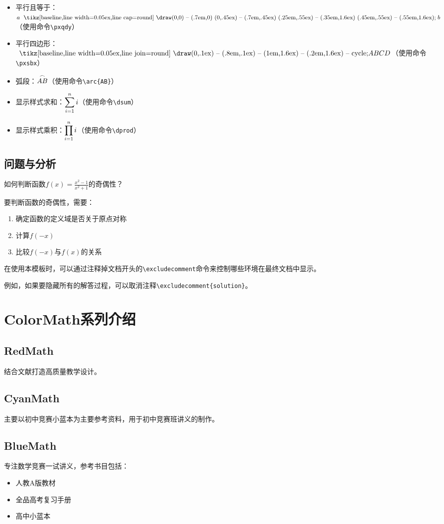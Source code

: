 \documentclass[fancy]{ColorMath} %
\begin{document}
\begin{itemize}
    \item 平行且等于：$a \pxqdy b$（使用命令\verb|\pxqdy|）
    \item 平行四边形：$\pxsbx ABCD$（使用命令\verb|\pxsbx|）
    \item 弧段：$\overset{\frown}{AB}$（使用命令\verb|\arc{AB}|）
    \item 显示样式求和：$\displaystyle\sum_{i=1}^n i$（使用命令\verb|\dsum|）
    \item 显示样式乘积：$\displaystyle\prod_{i=1}^n i$（使用命令\verb|\dprod|）
\end{itemize}


\subsection{问题与分析}

\begin{example}
    如何判断函数$f(x) = \frac{x^2 - 1}{x^2 + 1}$的奇偶性？
\end{example}

\begin{analysis}
    要判断函数的奇偶性，需要：
    \begin{enumerate}
        \item 确定函数的定义域是否关于原点对称
        \item 计算$f(-x)$
        \item 比较$f(-x)$与$f(x)$的关系
    \end{enumerate}
\end{analysis}

\begin{note}
    在使用本模板时，可以通过注释掉文档开头的\verb|\excludecomment|命令来控制哪些环境在最终文档中显示。

    例如，如果要隐藏所有的解答过程，可以取消注释\verb|\excludecomment{solution}|。
\end{note}

\section{ColorMath系列介绍}
\subsection{RedMath}
结合文献打造高质量教学设计。

\subsection{CyanMath}
主要以初中竞赛小蓝本为主要参考资料，用于初中竞赛班讲义的制作。

\subsection{BlueMath}
专注数学竞赛一试讲义，参考书目包括：
\begin{itemize}
    \item 人教A版教材
    \item 全品高考复习手册
    \item 高中小蓝本
\end{itemize}
\end{document}
